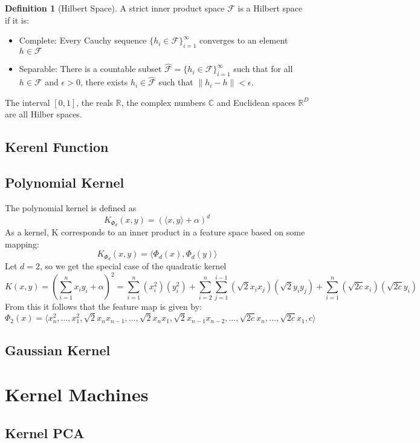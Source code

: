 \documentclass[12pt]{article}
\theoremstyle{definition}
\newtheorem{definition}{Definition}[section]
\theoremstyle{remark}
\begin{document}
\begin{definition}[Hilbert Space]
  A strict inner product space \(\mathcal{F}\) is a Hilbert space if it is:
  \begin{itemize}
    \item Complete: Every Cauchy sequence \(\{ h_i \in \mathcal{F} \}_{i=1}^\infty\) converges to an element \(h \in \mathcal{F}\)
    \item Separable: There is a countable subset \( \mathcal{\hat{F}} = \{ h_i \in \mathcal{F} \}_{i=1}^\infty \) such that for all \(h \in \mathcal{F}\) and \(\epsilon > 0 \), there exists \(h_i \in \mathcal{\hat{F}}\) such that \(\| h_i - h\| < \epsilon\).
  \end{itemize}
\end{definition}

The interval \([0, 1]\), the reals \(\mathbb{R}\), the complex numbers \(\mathbb{C}\) and Euclidean spaces \(\mathbb{R}^D\) are all Hilber spaces.
\subsection{Kerenl Function}
\subsection{Polynomial Kernel}
The polynomial kernel is defined as
\[
  K_{\Phi_{d}}(x, y) = {(\langle x,y \rangle + \alpha)}^{d}
\]
As a kernel, K corresponds to an inner product in a feature space based on some mapping:
\[
  K_{\Phi_{d}}(x, y) = \langle \Phi_{d}(x), \Phi_{d}(y) \rangle
\]
Let \( d=2 \), so we get the special case of the quadratic kernel
\[
  K(x, y) = (\sum_{i=1}^{n} x_{i}y_{i} + \alpha)^{2} = \sum_{i=1}^{n}(x_{i}^{2})(y_{i}^{2}) + \sum_{i=2}^{n}\sum_{j=1}^{i-1}(\sqrt{2}x_{i}x_{j})(\sqrt{2}y_{i}y_{j}) + \sum_{i=1}^{n}(\sqrt{2c}x_{i})(\sqrt{2c}y_{i})
\]
From this it follows that the feature map is given by:
\[
\Phi_{2}(x) = \langle x_{n}^{2},\dots,x_{1}^{2},\sqrt{2}x_{n}x_{n-1},\dots,\sqrt{2}x_{n}x_{1},\sqrt{2}x_{n-1}x_{n-2},\dots,\sqrt{2c}x_{n},\dots,\sqrt{2c}x_{1},c \rangle
\]


\subsection{Gaussian Kernel}

\section{Kernel Machines}
\subsection{Kernel PCA}
\end{document}
